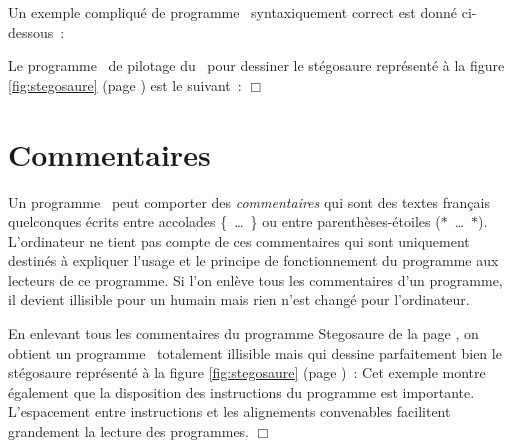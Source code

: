 Un exemple compliqué de programme \pascal\ syntaxiquement correct
est donné ci-\hbox{dessous :}
\begin{exemple}[Le stégosaure]{\rm
Le programme \pascal\ de pilotage du \robot\ pour
dessiner le sté\-go\-sau\-re re\-pré\-sen\-té  à la fi\-gu\-re
\ref{fig:stegosaure} (page \pageref{fig:stegosaure}) est le \hbox{suivant :}
\label{prog:Stegosaure} 
\noindent $\Box$ }\end{exemple}

\section{Commentaires} 

Un programme \pascal\ peut comporter des {\em commentaires} qui sont
des textes français quelconques écrits entre accolades {\cmt \{\ \ldots\ \}}
ou entre pa\-ren\-thè\-ses-étoi\-les {\cmt ($\ast$\ \ldots\ $\ast$)}.
L'or\-di\-na\-teur ne tient pas compte de ces commentaires qui sont uniquement
destinés à expliquer l'usage et le principe de fonctionnement du
programme aux lecteurs de ce programme. Si l'on enlève tous les
commentaires d'un programme, il devient illisible pour un humain mais
rien n'est changé pour l'or\-di\-na\-teur.

\begin{exemple}{\rm
En enlevant tous les com\-men\-tai\-res du programme {\idt Stegosaure}
de la page \pageref{prog:Stegosaure}, on obtient un programme \pascal\
totalement illisible mais qui dessine parfaitement bien le 
sté\-go\-sau\-re re\-pré\-sen\-té  à la fi\-gu\-re
\ref{fig:stegosaure} (page \hbox{\pageref{fig:stegosaure}) :}
{\small}
Cet exemple montre également que la disposition des instructions du
programme est importante. L'espacement entre instructions et les
alignements convenables facilitent grandement la lecture des
programmes.
\noindent $\Box$ }\end{exemple}



